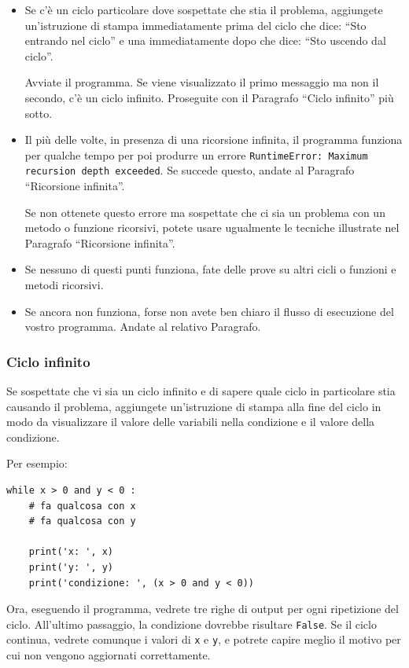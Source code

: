 \documentclass[10pt]{book}
\begin{document}
\begin{itemize}

\item Se c'è un ciclo particolare dove sospettate che stia il problema, aggiungete un'istruzione di stampa immediatamente prima del ciclo che dice:
``Sto entrando nel ciclo'' e una immediatamente dopo che dice:
``Sto uscendo dal ciclo''.

Avviate il programma. Se viene visualizzato il primo messaggio ma non il secondo, c'è un ciclo infinito. Proseguite con il Paragrafo ``Ciclo infinito'' più sotto.

\item Il più delle volte, in presenza di una ricorsione infinita, il programma funziona per qualche tempo per poi produrre un errore {\tt RuntimeError: Maximum
recursion depth exceeded}.  Se succede questo, andate al Paragrafo
``Ricorsione infinita''.

Se non ottenete questo errore ma sospettate che ci sia un problema con un metodo o funzione ricorsivi, potete usare ugualmente le tecniche illustrate nel Paragrafo ``Ricorsione infinita''.

\item Se nessuno di questi punti funziona, fate delle prove su altri cicli o funzioni e metodi ricorsivi.

\item Se ancora non funziona, forse non avete ben chiaro il flusso di esecuzione del vostro programma. Andate al relativo Paragrafo.

\end{itemize}


\subsubsection{Ciclo infinito}

Se sospettate che vi sia un ciclo infinito e di sapere quale ciclo in particolare stia causando il problema, aggiungete un'istruzione di stampa alla fine del ciclo in modo da visualizzare il valore delle variabili nella condizione e il valore della condizione.

Per esempio:

\begin{verbatim}
while x > 0 and y < 0 :
    # fa qualcosa con x
    # fa qualcosa con y

    print('x: ', x)
    print('y: ', y)
    print('condizione: ', (x > 0 and y < 0))
\end{verbatim}
%
Ora, eseguendo il programma, vedrete tre righe di output per ogni ripetizione del ciclo. All'ultimo passaggio, la condizione dovrebbe risultare {\tt False}.  Se il ciclo continua, vedrete comunque i valori di {\tt x} e {\tt y}, e potrete capire meglio il motivo per cui non vengono aggiornati correttamente.
\end{document}
